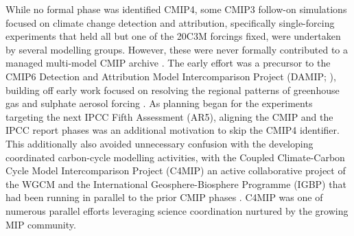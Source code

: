 \documentclass[gmd, preprint]{copernicus}
\newcommand{\mycomment}[1]{}
\begin{document}
While no formal phase was identified CMIP4, some CMIP3 follow-on simulations focused on climate change detection and attribution, specifically single-forcing experiments that held all but one of the 20C3M forcings fixed, were undertaken by several modelling groups. However, these were never formally contributed to a managed multi-model CMIP archive \citep{stouffer_cmip5_2017}. The early effort was a precursor to the CMIP6 Detection and Attribution Model Intercomparison Project (DAMIP; \citet{gillett_detection_2016}), building off early work focused on resolving the regional patterns of greenhouse gas and sulphate aerosol forcing \cite{taylor_response_1994, santer_towards_1995, hegerl_optimal_2000, gillett_detecting_2002, hegerl_20c3m_2003}. As planning began for the experiments targeting the next IPCC Fifth Assessment (AR5), aligning the CMIP and the IPCC report phases was an additional motivation to skip the CMIP4 identifier. This additionally also avoided unnecessary confusion with the developing coordinated carbon-cycle modelling activities, with the Coupled Climate-Carbon Cycle Model Intercomparison Project (C4MIP) an active collaborative project of the WGCM and the International Geosphere-Biosphere Programme (IGBP) that had been running in parallel to the prior CMIP phases \citep{fung_full-form_2000, cox_modelling_2002, friedlingstein_climatecarbon_2006}. C4MIP was one of numerous parallel efforts leveraging science coordination nurtured by the growing MIP community.
\mycomment{
CMIP4 comment - https://www.wcrp-climate.org/images/modelling/WGCM/WGCM17/WGCM17_report.pdf#Page=8
}
\end{document}
